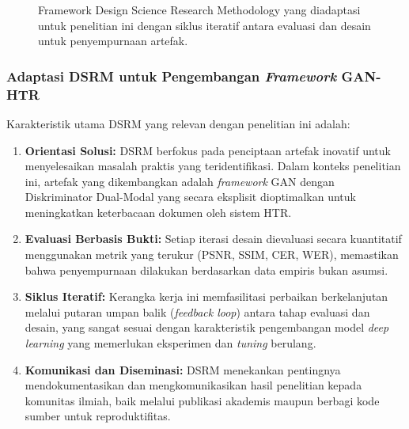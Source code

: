 \documentclass[12pt,a4paper]{article}
\begin{document}
\begin{figure}[H]
\caption{Framework Design Science Research Methodology yang diadaptasi untuk penelitian ini dengan siklus iteratif antara evaluasi dan desain untuk penyempurnaan artefak.}
\label{fig:dsrm-framework}
\end{figure}

\subsubsection{Adaptasi DSRM untuk Pengembangan \textit{Framework} GAN-HTR}
Karakteristik utama DSRM yang relevan dengan penelitian ini adalah:

\begin{enumerate}[label=\arabic*., leftmargin=*, nosep]
\item \textbf{Orientasi Solusi:} DSRM berfokus pada penciptaan artefak inovatif untuk menyelesaikan masalah praktis yang teridentifikasi. Dalam konteks penelitian ini, artefak yang dikembangkan adalah \textit{framework} GAN dengan Diskriminator Dual-Modal yang secara eksplisit dioptimalkan untuk meningkatkan keterbacaan dokumen oleh sistem HTR.

\item \textbf{Evaluasi Berbasis Bukti:} Setiap iterasi desain dievaluasi secara kuantitatif menggunakan metrik yang terukur (PSNR, SSIM, CER, WER), memastikan bahwa penyempurnaan dilakukan berdasarkan data empiris bukan asumsi.

\item \textbf{Siklus Iteratif:} Kerangka kerja ini memfasilitasi perbaikan berkelanjutan melalui putaran umpan balik (\textit{feedback loop}) antara tahap evaluasi dan desain, yang sangat sesuai dengan karakteristik pengembangan model \textit{deep learning} yang memerlukan eksperimen dan \textit{tuning} berulang.

\item \textbf{Komunikasi dan Diseminasi:} DSRM menekankan pentingnya mendokumentasikan dan mengkomunikasikan hasil penelitian kepada komunitas ilmiah, baik melalui publikasi akademis maupun berbagi kode sumber untuk reproduktifitas.
\end{enumerate}
\end{document}
